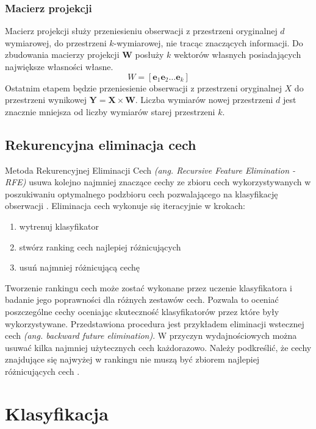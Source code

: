 \documentclass[a4paper,12pt,twoside,openany]{report}
\newcommand{\ang}[1]{\textit{(ang. #1)}}
\renewcommand{\vec}[1]{\bm{#1}}
\begin{document}
\subsubsection{Macierz projekcji}
Macierz projekcji służy przeniesieniu obserwacji z przestrzeni oryginalnej $d$ wymiarowej,
do przestrzeni $k$-wymiarowej, nie tracąc znaczących informacji.
Do zbudowania macierzy projekcji $\vec W$ posłuży $k$ wektorów własnych posiadających największe własności własne.
\begin{equation}
	W = [\vec e_1 \vec e_2 \dots \vec e_k]
\end{equation}
Ostatnim etapem będzie przeniesienie obserwacji z przestrzeni oryginalnej $X$ do przestrzeni wynikowej $\vec Y = \vec X \times \vec W$.
Liczba wymiarów nowej przestrzeni $d$ jest znacznie mniejsza od liczby wymiarów starej przestrzeni $k$.
\subsection{Rekurencyjna eliminacja cech}\label{sec:rfe}
Metoda Rekurencyjnej Eliminacji Cech \ang{Recursive Feature Elimination - RFE}
usuwa kolejno najmniej znaczące cechy ze zbioru cech wykorzystywanych
w poszukiwaniu optymalnego podzbioru cech pozwalającego na klasyfikację obserwacji \cite{Guyon2002}.
Eliminacja cech wykonuje się iteracyjnie w krokach:
\begin{enumerate}
	\item wytrenuj klasyfikator
	\item stwórz ranking cech najlepiej różnicujących
	\item usuń najmniej różnicującą cechę
\end{enumerate}
Tworzenie rankingu cech może zostać wykonane przez uczenie klasyfikatora i badanie jego poprawności dla różnych zestawów cech.
Pozwala to oceniać poszczególne cechy oceniając skuteczność klasyfikatorów przez które były wykorzystywane.
Przedstawiona procedura jest przykładem eliminacji wstecznej cech \ang{backward future elimination}.
W przyczyn wydajnościowych można usuwać kilka najmniej użytecznych cech każdorazowo.
Należy podkreślić, że cechy znajdujące się najwyżej w rankingu nie muszą być zbiorem najlepiej różnicujących cech \cite{Guyon2002}.
\section{Klasyfikacja}
\end{document}
